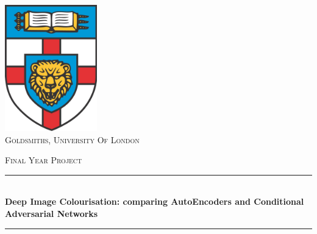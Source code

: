 
    \begin{titlepage}

\newcommand{\HRule}{\rule{\linewidth}{0.5mm}} %

\centering
\includegraphics[width=4cm]{sections/figures/goldsmiths_logo.png}\\[1cm] %
\textsc{\LARGE Goldsmiths, University Of London}\\[1.5cm] %

\center %


\textsc{\LARGE Final Year Project}\\[1.5cm] 


\makeatletter
\HRule \\[0.4cm]
{ \huge \bfseries Deep Image Colourisation:  comparing AutoEncoders and Conditional Adversarial Networks}\\[0.4cm]%
\HRule \\[1.5cm]
 


\end{titlepage}
